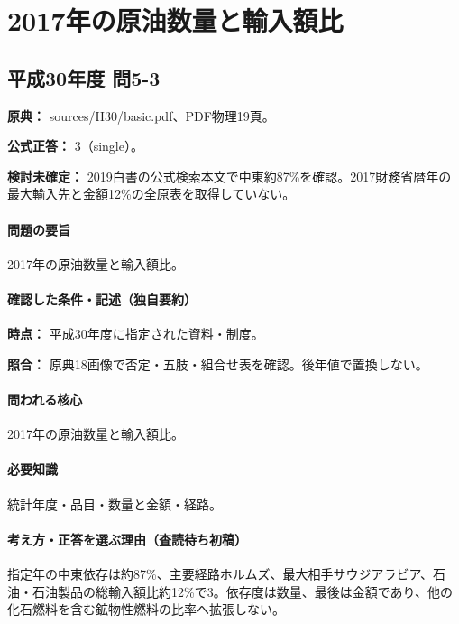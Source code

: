 \section{2017年の原油数量と輸入額比}

\subsection{平成30年度 問5-3}
\label{q:h30-reg-basic-5-3}

\noindent\textbf{原典：} sources/H30/basic.pdf、PDF物理19頁。

\textbf{公式正答：} 3（single）。

\par\textbf{検討未確定：} 2019白書の公式検索本文で中東約87\%を確認。2017財務省暦年の最大輸入先と金額12\%の全原表を取得していない。

\paragraph{問題の要旨} 2017年の原油数量と輸入額比。

\paragraph{確認した条件・記述（独自要約）}\mbox{}\par

\noindent\textbf{時点：} 平成30年度に指定された資料・制度。\par

\noindent\textbf{照合：} 原典18画像で否定・五肢・組合せ表を確認。後年値で置換しない。\par

\paragraph{問われる核心} 2017年の原油数量と輸入額比。

\paragraph{必要知識} 統計年度・品目・数量と金額・経路。

\paragraph{考え方・正答を選ぶ理由（査読待ち初稿）} 指定年の中東依存は約87\%、主要経路ホルムズ、最大相手サウジアラビア、石油・石油製品の総輸入額比約12\%で3。依存度は数量、最後は金額であり、他の化石燃料を含む鉱物性燃料の比率へ拡張しない。

